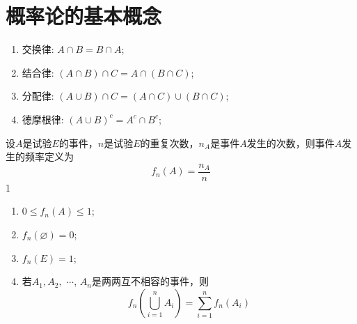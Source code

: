 \chapter{概率论的基本概念} %
\label{chap:pro}

\begin{property}[集合运算的基本性质]
   \begin{enumerate}
    \item 交换律: $A\cap B=B\cap A$;
    \item 结合律: $(A\cap B)\cap C=A\cap(B\cap C)$;
    \item 分配律: $(A\cup B)\cap C=(A\cap C)\cup(B\cap C)$;
    \item 德摩根律: $(A\cup B)^c=A^c\cap B^c$;
   \end{enumerate}
 \end{property}

 \begin{property} [频率]
      设$A$是试验$E$的事件，$n$是试验$E$的重复次数，$n_A$是事件$A$发生的次数，则事件$A$发生的频率定义为
      \begin{equation}
        f_n(A)=\frac{n_A}{n}
      \end{equation}
1      \begin{enumerate}
        \item 0$\leq f_n(A)\leq 1$;
        \item $f_n(\varnothing)=0$;
        \item $f_n(E)=1$;
\item 若$A_1,A_2,$ $\cdots$, $A_n$是两两互不相容的事件，则\[
  f_n(\bigcup_{i=1}^nA_i)=\sum_{i=1}^nf_n(A_i)
\]
      


          

      \end{enumerate}
\end{property}


